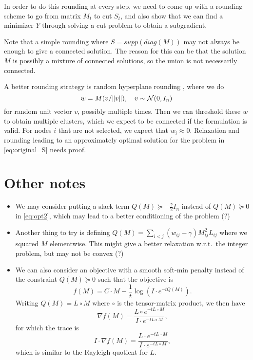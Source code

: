 \documentclass{article}
\begin{document}
In order to do this rounding at every step, we need to come up with a rounding scheme to go from matrix $M_t$ to cut $S_t$, and also show that we can find a minimizer $Y$ through solving a cut problem to obtain a subgradient.

Note that a simple rounding where $S = supp(diag(M))$ may not always be enough to give a connected solution. The reason for this can be that the solution $M$ is possibly a mixture of connected solutions, so the union is not necessarily connected.

A better rounding strategy is random hyperplane rounding \cite{rounding}, where we do
\[ w = M (v/\|v\|), \quad v \sim {\cal N}(0, I_n) \]
for random unit vector $v$, possibly multiple times. Then we can threshold these $w$ to obtain multiple clusters, which we expect to be connected if the formulation is valid. For nodes $i$ that are not selected, we expect that $w_i \approx 0$. Relaxation and rounding leading to an approximately optimal solution for the problem in \eqref{eq:original_S} needs proof.



\section{Other notes}

\begin{itemize}
  \item We may consider putting a slack term $Q(M) \succeq -\frac{\gamma}{2} I_n$ instead of $Q(M) \succeq 0$ in \eqref{eq:opt2}, which may lead to a better conditioning of the problem (?)
  \item Another thing to try is defining $Q(M) = \sum_{i<j} (w_{ij} - \gamma) M_{ij}^2 L_{ij}$ where we squared $M$ elementwise. This might give a better relaxation w.r.t.\ the integer problem, but may not be convex (?)
  \item We can also consider an objective with a smooth soft-min penalty instead of the constraint $Q(M) \succeq 0$ such that the objective is
    \[ f(M) = C \cdot M - \frac{1}{t} \log \left( I \cdot e^{-t Q(M)} \right). \]
    Writing $Q(M) = L \circ M$ where $\circ$ is the tensor-matrix product, we then have
    \[ \nabla f(M) = \frac{L \circ e^{-t L \circ M}}{I \cdot e^{-t L \circ M}}, \]
    for which the trace is 
    \[ I \cdot \nabla f(M) = \frac{L \cdot e^{-t L \circ M}}{I \cdot e^{-t L \circ M}}, \]
    which is similar to the Rayleigh quotient for $L$.
\end{itemize}
\end{document}
